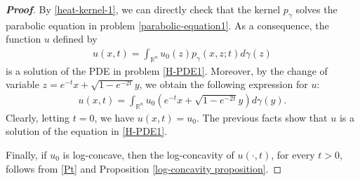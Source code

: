 \documentclass[10pt,a4paper]{amsart}
\newcommand{\R}{\mathbb R}
\begin{document}
\begin{proof}[\bf Proof]
By \eqref{heat-kernel-1}, we can directly check that the kernel $p_\gamma$ solves the parabolic equation in problem \eqref{parabolic-equation1}. As a consequence, the function $u$ defined by
\begin{equation}\label{Pt}
\begin{aligned}
u(x,t)=\int_{\R^n} u_0(z) p_\gamma(x,z;t) d\gamma(z)
\end{aligned}
\end{equation}
is a solution of the PDE in problem \eqref{H-PDE1}. Moreover, by the change of variable $z=e^{-t}x+\sqrt{1-e^{-2t}}y$, we obtain the following expression for $u$:
\begin{equation}\nonumber
\begin{aligned}
u(x,t)=\int_{\R^n} u_0(e^{-t}x+\sqrt{1-e^{-2t}}y) d\gamma(y).
\end{aligned}
\end{equation}
Clearly, letting $t=0$, we have $u(x,t)=u_0$. The previous facts show that $u$ is a solution of the equation in \eqref{H-PDE1}.

Finally, if $u_0$ is log-concave, then the log-concavity of $u(\cdot,t)$, for every $t>0$, follows from \eqref{Pt} and Proposition \ref{log-concavity proposition}.
\end{proof}
\end{document}
